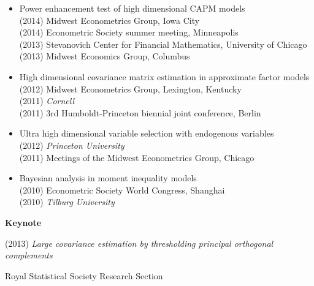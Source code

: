 \documentclass[11pt]{article}
\begin{document}
\begin{itemize}
  \item Power enhancement test of high dimensional CAPM models \hfill\\
   (2014) Midwest Econometrics Group, Iowa City\\
      (2014) Econometric Society summer meeting, Minneapolis\\
  (2013) Stevanovich Center for Financial Mathematics,  University of Chicago \\
  (2013)   Midwest Economics Group, Columbus




 \item High dimensional covariance matrix estimation in approximate factor models \hfill\\
  (2012) Midwest Econometrics Group, Lexington, Kentucky\\
  (2011)   \textit{ Cornell}\\
  (2011)  3rd Humboldt-Princeton biennial joint conference, Berlin



\item Ultra high dimensional variable selection with endogenous variables  \hfill\\
(2012)  \textit{Princeton University}\\
(2011) Meetings of the Midwest Econometrics Group, Chicago  




\item Bayesian analysis in moment inequality models \hfill\\
(2010) Econometric Society World Congress, Shanghai\\
(2010)   \textit{Tilburg University}



\end{itemize}

\textbf{Keynote}



  (2013) \textit{Large covariance estimation by thresholding principal orthogonal complements}


 Royal Statistical Society Research Section  \\



\end{document}
